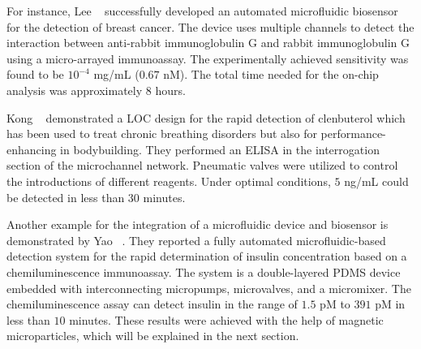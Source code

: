 For instance, Lee \etal{}~\cite{Lee2007} successfully developed an automated microfluidic biosensor for the detection of breast cancer. The device uses multiple channels to detect the interaction between anti-rabbit immunoglobulin G and rabbit immunoglobulin G using a micro-arrayed immunoassay. The experimentally achieved sensitivity was found to be $10^{-4}$ mg/mL ($0.67$ nM). The total time needed for the on-chip analysis was approximately $8$ hours. 

Kong \etal{}~\cite{Kong2009} demonstrated a LOC design for the rapid detection of clenbuterol which has been used to treat chronic breathing disorders but also for performance-enhancing in bodybuilding. They performed an ELISA in the interrogation section of the microchannel network. Pneumatic valves were utilized to control the introductions of different reagents. Under optimal conditions, $5$ ng/mL could be detected in less than $30$ minutes.

Another example for the integration of a microfluidic device and biosensor is demonstrated by Yao \etal{}~\cite{Yao2016}. They reported a fully automated microfluidic-based detection system for the rapid determination of insulin concentration based on a chemiluminescence immunoassay. The system is a double-layered PDMS device embedded with interconnecting micropumps, microvalves, and a micromixer. The chemiluminescence assay can detect insulin in the range of $1.5$ pM to $391$ pM in less than $10$ minutes. These results were achieved with the help of magnetic microparticles, which will be explained in the next section.




